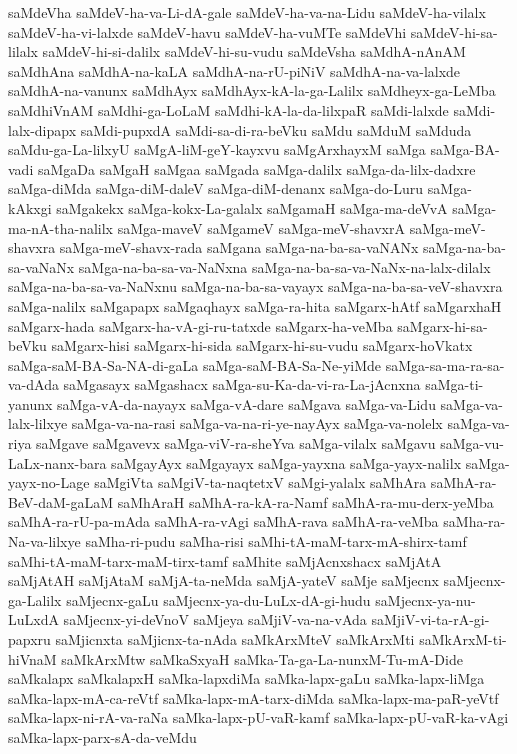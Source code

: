 {saMdeVha
saMdeV-ha-va-Li-dA-gale
saMdeV-ha-va-na-Lidu
saMdeV-ha-vilalx
saMdeV-ha-vi-lalxde
saMdeV-havu
saMdeV-ha-vuMTe
saMdeVhi
saMdeV-hi-sa-lilalx
saMdeV-hi-si-dalilx
saMdeV-hi-su-vudu
saMdeVsha
saMdhA-nAnAM
saMdhAna
saMdhA-na-kaLA
saMdhA-na-rU-piNiV
saMdhA-na-va-lalxde
saMdhA-na-vanunx
saMdhAyx
saMdhAyx-kA-la-ga-Lalilx
saMdheyx-ga-LeMba
saMdhiVnAM
saMdhi-ga-LoLaM
saMdhi-kA-la-da-lilxpaR
saMdi-lalxde
saMdi-lalx-dipapx
saMdi-pupxdA
saMdi-sa-di-ra-beVku
saMdu
saMduM
saMduda
saMdu-ga-La-lilxyU
saMgA-liM-geY-kayxvu
saMgArxhayxM
saMga
saMga-BA-vadi
saMgaDa
saMgaH
saMgaa
saMgada
saMga-dalilx
saMga-da-lilx-dadxre
saMga-diMda
saMga-diM-daleV
saMga-diM-denanx
saMga-do-Luru
saMga-kAkxgi
saMgakekx
saMga-kokx-La-galalx
saMgamaH
saMga-ma-deVvA
saMga-ma-nA-tha-nalilx
saMga-maveV
saMgameV
saMga-meV-shavxrA
saMga-meV-shavxra
saMga-meV-shavx-rada
saMgana
saMga-na-ba-sa-vaNANx
saMga-na-ba-sa-vaNaNx
saMga-na-ba-sa-va-NaNxna
saMga-na-ba-sa-va-NaNx-na-lalx-dilalx
saMga-na-ba-sa-va-NaNxnu
saMga-na-ba-sa-vayayx
saMga-na-ba-sa-veV-shavxra
saMga-nalilx
saMgapapx
saMgaqhayx
saMga-ra-hita
saMgarx-hAtf
saMgarxhaH
saMgarx-hada
saMgarx-ha-vA-gi-ru-tatxde
saMgarx-ha-veMba
saMgarx-hi-sa-beVku
saMgarx-hisi
saMgarx-hi-sida
saMgarx-hi-su-vudu
saMgarx-hoVkatx
saMga-saM-BA-Sa-NA-di-gaLa
saMga-saM-BA-Sa-Ne-yiMde
saMga-sa-ma-ra-sa-va-dAda
saMgasayx
saMgashacx
saMga-su-Ka-da-vi-ra-La-jAcnxna
saMga-ti-yanunx
saMga-vA-da-nayayx
saMga-vA-dare
saMgava
saMga-va-Lidu
saMga-va-lalx-lilxye
saMga-va-na-rasi
saMga-va-na-ri-ye-nayAyx
saMga-va-nolelx
saMga-va-riya
saMgave
saMgavevx
saMga-viV-ra-sheYva
saMga-vilalx
saMgavu
saMga-vu-LaLx-nanx-bara
saMgayAyx
saMgayayx
saMga-yayxna
saMga-yayx-nalilx
saMga-yayx-no-Lage
saMgiVta
saMgiV-ta-naqtetxV
saMgi-yalalx
saMhAra
saMhA-ra-BeV-daM-gaLaM
saMhAraH
saMhA-ra-kA-ra-Namf
saMhA-ra-mu-derx-yeMba
saMhA-ra-rU-pa-mAda
saMhA-ra-vAgi
saMhA-rava
saMhA-ra-veMba
saMha-ra-Na-va-lilxye
saMha-ri-pudu
saMha-risi
saMhi-tA-maM-tarx-mA-shirx-tamf
saMhi-tA-maM-tarx-maM-tirx-tamf
saMhite
saMjAcnxshacx
saMjAtA
saMjAtAH
saMjAtaM
saMjA-ta-neMda
saMjA-yateV
saMje
saMjecnx
saMjecnx-ga-Lalilx
saMjecnx-gaLu
saMjecnx-ya-du-LuLx-dA-gi-hudu
saMjecnx-ya-nu-LuLxdA
saMjecnx-yi-deVnoV
saMjeya
saMjiV-va-na-vAda
saMjiV-vi-ta-rA-gi-papxru
saMjicnxta
saMjicnx-ta-nAda
saMkArxMteV
saMkArxMti
saMkArxM-ti-hiVnaM
saMkArxMtw
saMkaSxyaH
saMka-Ta-ga-La-nunxM-Tu-mA-Dide
saMkalapx
saMkalapxH
saMka-lapxdiMa
saMka-lapx-gaLu
saMka-lapx-liMga
saMka-lapx-mA-ca-reVtf
saMka-lapx-mA-tarx-diMda
saMka-lapx-ma-paR-yeVtf
saMka-lapx-ni-rA-va-raNa
saMka-lapx-pU-vaR-kamf
saMka-lapx-pU-vaR-ka-vAgi
saMka-lapx-parx-sA-da-veMdu
}
